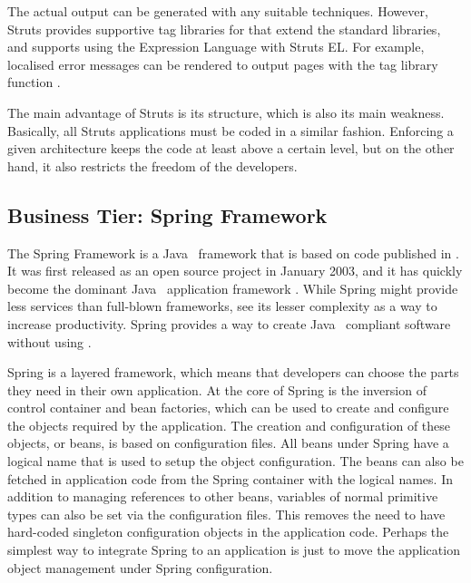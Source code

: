 The actual  output can be generated with any suitable 
techniques. However, Struts provides supportive tag libraries for 
 that extend the standard  libraries, and 
supports using the  Expression Language with Struts EL. 
For example, localised error messages can be rendered to output pages 
with the  tag library function .

The main advantage of Struts is its structure, which is also its main 
weakness. Basically, all Struts applications must be coded in a 
similar fashion. Enforcing a given architecture keeps the code at 
least above a certain level, but on the other hand, it also restricts 
the freedom of the developers.


\subsection{Business Tier: Spring Framework}
\label{toc:oss:selected:spring}

The Spring Framework \citep{spring} is a Java~ framework 
that is based on code published in \citep{j2eednd}. It was first 
released as an open source project in January 2003, and it has quickly 
become the dominant Java~ application framework 
\citep{j2eeframeworks}. While Spring might provide less services than 
full-blown frameworks, \cite{rapidspring} see its lesser complexity as 
a way to increase productivity. Spring provides a way to create 
Java~ compliant software without using .

Spring is a layered framework, which means that developers can choose 
the parts they need in their own application. At the core of Spring is 
the inversion of control container and bean factories, which can be 
used to create and configure the objects required by the application. 
The creation and configuration of these objects, or beans, is based on 
 configuration files. All beans under Spring have a 
logical name that is used to setup the object configuration. The beans 
can also be fetched in application code from the Spring container with 
the logical names. In addition to managing references to other beans, 
variables of normal primitive types can also be set via the 
configuration files. This removes the need to have hard-coded 
singleton configuration objects in the application code. Perhaps the 
simplest way to integrate Spring to an application is just to move the 
application object management under Spring configuration. 
\citep{springintro}

